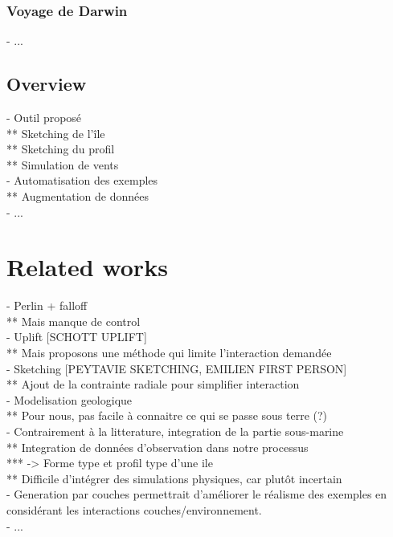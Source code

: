 \subsubsection{Voyage de Darwin}
- ...

\subsection{Overview}
- Outil proposé \\
** Sketching de l'île \\
** Sketching du profil \\
** Simulation de vents \\
- Automatisation des exemples \\
** Augmentation de données \\
- ...

\section{Related works}
\label{sec:coral-island_related-works}
- Perlin + falloff \\
** Mais manque de control \\
- Uplift [SCHOTT UPLIFT] \cite{Cordonnier2016,Cordonnier2017a} \\
** Mais proposons une méthode qui limite l'interaction demandée \\
- Sketching [PEYTAVIE SKETCHING, EMILIEN FIRST PERSON] \cite{Gain2009} \\
** Ajout de la contrainte radiale pour simplifier interaction \\
- Modelisation geologique \cite{Patel2021} \\
** Pour nous, pas facile à connaitre ce qui se passe sous terre (?) \\
- Contrairement à la litterature, integration de la partie sous-marine \\
** Integration de données d'observation dans notre processus \\
*** -> Forme type et profil type d'une ile \\
** Difficile d'intégrer des simulations physiques, car plutôt incertain \\
- Generation par couches permettrait d'améliorer le réalisme des exemples en considérant les interactions couches/environnement. \\
- ... 

